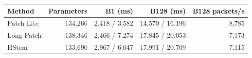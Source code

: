 \begin{tabular}{lrrrr}
\toprule Method & Parameters & B1 (ms) & B128 (ms) & B128 packets/s\\
\midrule
Patch-Lite & 134,266 & 2.418 / 3.582 & 14.570 / 16.196 & 8,785\\
Long-Patch & 138,346 & 2.466 / 7.274 & 17.845 / 20.053 & 7,173\\
HStem & 133,690 & 2.967 / 6.047 & 17.991 / 20.709 & 7,115\\
\bottomrule
\end{tabular}
